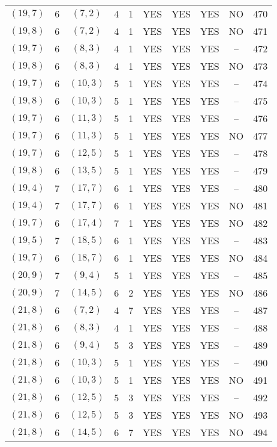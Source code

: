 \begin{longtable}{|c|c|c|c|c|c|c|c|c|c|}
$(19, 7)$ & 6 & $(7, 2)$ & 4 & 1 & YES & YES & YES & NO & 470\\
$(19, 8)$ & 6 & $(7, 2)$ & 4 & 1 & YES & YES & YES & NO & 471\\
$(19, 7)$ & 6 & $(8, 3)$ & 4 & 1 & YES & YES & YES & -- & 472\\
$(19, 8)$ & 6 & $(8, 3)$ & 4 & 1 & YES & YES & YES & NO & 473\\
$(19, 7)$ & 6 & $(10, 3)$ & 5 & 1 & YES & YES & YES & -- & 474\\
$(19, 8)$ & 6 & $(10, 3)$ & 5 & 1 & YES & YES & YES & -- & 475\\
$(19, 7)$ & 6 & $(11, 3)$ & 5 & 1 & YES & YES & YES & -- & 476\\
$(19, 7)$ & 6 & $(11, 3)$ & 5 & 1 & YES & YES & YES & NO & 477\\
$(19, 7)$ & 6 & $(12, 5)$ & 5 & 1 & YES & YES & YES & -- & 478\\
$(19, 8)$ & 6 & $(13, 5)$ & 5 & 1 & YES & YES & YES & -- & 479\\
$(19, 4)$ & 7 & $(17, 7)$ & 6 & 1 & YES & YES & YES & -- & 480\\
$(19, 4)$ & 7 & $(17, 7)$ & 6 & 1 & YES & YES & YES & NO & 481\\
$(19, 7)$ & 6 & $(17, 4)$ & 7 & 1 & YES & YES & YES & NO & 482\\
$(19, 5)$ & 7 & $(18, 5)$ & 6 & 1 & YES & YES & YES & -- & 483\\
$(19, 7)$ & 6 & $(18, 7)$ & 6 & 1 & YES & YES & YES & NO & 484\\
$(20, 9)$ & 7 & $(9, 4)$ & 5 & 1 & YES & YES & YES & -- & 485\\
$(20, 9)$ & 7 & $(14, 5)$ & 6 & 2 & YES & YES & YES & NO & 486\\
$(21, 8)$ & 6 & $(7, 2)$ & 4 & 7 & YES & YES & YES & -- & 487\\
$(21, 8)$ & 6 & $(8, 3)$ & 4 & 1 & YES & YES & YES & -- & 488\\
$(21, 8)$ & 6 & $(9, 4)$ & 5 & 3 & YES & YES & YES & -- & 489\\
$(21, 8)$ & 6 & $(10, 3)$ & 5 & 1 & YES & YES & YES & -- & 490\\
$(21, 8)$ & 6 & $(10, 3)$ & 5 & 1 & YES & YES & YES & NO & 491\\
$(21, 8)$ & 6 & $(12, 5)$ & 5 & 3 & YES & YES & YES & -- & 492\\
$(21, 8)$ & 6 & $(12, 5)$ & 5 & 3 & YES & YES & YES & NO & 493\\
$(21, 8)$ & 6 & $(14, 5)$ & 6 & 7 & YES & YES & YES & NO & 494\\

\end{longtable}
